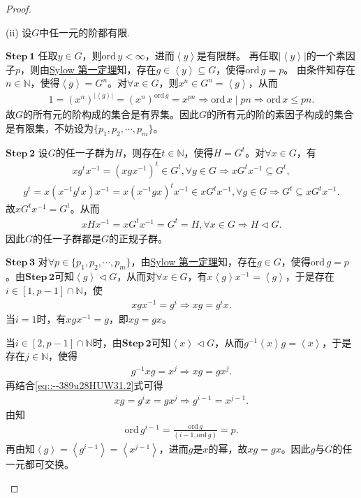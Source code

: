 \documentclass[../../main.tex]{subfiles}%
\begin{document}
\begin{proof}
\begin{enumerate}[(1)]
(ii) 设$G$中任一元的阶都有限.

$\mathbf{Step\,1}$ 任取$y\in G$，则$\mathrm{ord}\,y<\infty$，进而$\left< y \right>$是有限群。
再任取$|\left< y \right>|$的一个素因子$p$，则由\hyperref[theorem:Sylow 第一定理]{Sylow 第一定理}知，存在$g\in\left< y \right>\subseteq G$，使得$\mathrm{ord}\,g=p$。
由条件知存在$n\in\mathbb{N}$，使得$\left< g \right> =G^n$。对$\forall x\in G$，则$x^n\in G^n=\left< g \right>$，从而
\begin{align*}
1=(x^n)^{|\left< g \right>|}=(x^n)^{\mathrm{ord}\,g}=x^{pn}\Longrightarrow \mathrm{ord}\,x\mid pn\Longrightarrow \mathrm{ord}\,x\leqslant pn.
\end{align*}
故$G$的所有元的阶构成的集合是有界集。因此$G$的所有元的阶的素因子构成的集合是有限集，不妨设为$\{ p_1,p_2,\cdots,p_m \}$。

$\mathbf{Step\,2}$ 设$G$的任一子群为$H$，则存在$t\in\mathbb{N}$，使得$H=G^t$。对$\forall x\in G$，有
\begin{align*}
xg^tx^{-1}=(xgx^{-1})^t\in G^t,\forall g\in G\Longrightarrow xG^tx^{-1}\subseteq G^t,
\end{align*}
\begin{align*}
g^t=x(x^{-1}g^tx)x^{-1}=x(x^{-1}gx)^tx^{-1}\in xG^tx^{-1},\forall g\in G\Longrightarrow G^t\subseteq xG^tx^{-1}.
\end{align*}
故$xG^tx^{-1}=G^t$。从而
\begin{align*}
xHx^{-1}=xG^tx^{-1}=G^t=H,\forall x\in G\Longrightarrow H\lhd G.
\end{align*}
因此$G$的任一子群都是$G$的正规子群。

$\mathbf{Step\,3}$ 对$\forall p\in\{ p_1,p_2,\cdots,p_m \}$，由\hyperref[theorem:Sylow 第一定理]{Sylow 第一定理}知，存在$g\in G$，使得$\mathrm{ord}\,g=p$。由$\mathbf{Step\,2}$可知$\left< g \right>\lhd G$，从而对$\forall x\in G$，有$x\left< g \right>x^{-1}=\left< g \right>$，于是存在$i\in[1,p-1]\cap\mathbb{N}$，使
\begin{align}\label{eq::--389u28HUW31.2}
xgx^{-1}=g^i\Longrightarrow xg=g^ix.
\end{align}
当$i=1$时，有$xgx^{-1}=g$，即$xg=gx$。

当$i\in[2,p-1]\cap\mathbb{N}$时，由$\mathbf{Step\,2}$可知$\left< x \right>\lhd G$，从而$g^{-1}\left< x \right>g=\left< x \right>$，于是存在$j\in\mathbb{N}$，使得
\begin{align*}
g^{-1}xg=x^j\Longrightarrow xg=gx^j.
\end{align*}
再结合\eqref{eq::--389u28HUW31.2}式可得
\begin{align*}
xg=g^ix=gx^j\Longrightarrow g^{i-1}=x^{j-1}.
\end{align*}
由知
\begin{align*}
\mathrm{ord}\,g^{i-1}=\frac{\mathrm{ord}\,g}{(i-1,\mathrm{ord}\,g)}=p.
\end{align*}
再由知$\left< g \right> =\left< g^{i-1} \right> =\left< x^{j-1} \right>$，进而$g$是$x$的幂，故$xg=gx$。因此$g$与$G$的任一元都可交换。


\end{enumerate}
\end{proof}
\end{document}
